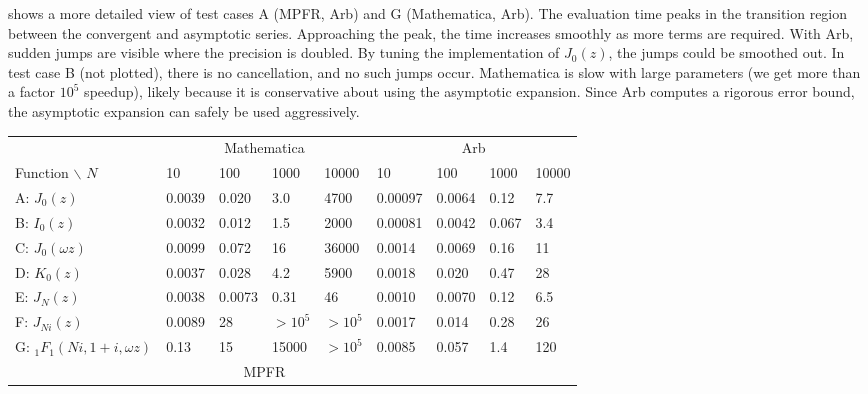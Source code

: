 \documentclass[11pt]{article}
\begin{document}
 shows a more detailed view of test cases A (MPFR, Arb) and G (Mathematica, Arb).
The evaluation time peaks in the transition region between the convergent and asymptotic series.
Approaching the peak, the time increases smoothly as more terms are required.
With Arb, sudden jumps are visible where the precision is doubled.
By tuning the implementation of $J_0(z)$, the jumps could be smoothed out.
In test case B (not plotted), there is no cancellation, and no such jumps occur.
Mathematica is slow with large parameters (we get more than a factor $10^5$ speedup),
likely because it is conservative about using the asymptotic expansion.
Since Arb computes a rigorous error bound, the asymptotic expansion
can safely be used aggressively.

\begin{table}
\renewcommand{\arraystretch}{1.4}
\setlength{\tabcolsep}{.4em}
\begin{center}
\begin{scriptsize}
\begin{tabular}{l | l l l l | l l l l}
                                  & \multicolumn{4}{|c|}{Mathematica} & \multicolumn{4}{|c}{Arb} \\
Function $\backslash$ $N$         &  10       & 100       & 1000 & 10000 &  10 & 100 & 1000 & 10000  \\ \hline
A: $J_0(z)$              &  0.0039   &  0.020    & 3.0     & 4700      &  0.00097   &  0.0064  &  0.12   &  7.7  \\
B: $I_0(z)$             &   0.0032   &  0.012    & 1.5     & 2000  &  0.00081   &  0.0042  &  0.067  &  3.4  \\
C: $J_0(\omega z)$      &   0.0099   &  0.072    & 16     & 36000      &  0.0014    &  0.0069  &  0.16   &  11   \\
D: $K_0(z)$             &   0.0037   &  0.028    & 4.2     &  5900  &  0.0018    &  0.020   &  0.47   &  28   \\
E: $J_N(z)$            &   0.0038   &  0.0073   & 0.31  &  46  &  0.0010    &  0.0070  &  0.12   &  6.5  \\
F: $J_{Ni}(z)$         &   0.0089   &  28       & $>10^5$     &   $>10^5$  &  0.0017    &  0.014   &  0.28   &  26   \\
G: ${}_1F_1(Ni,1+i,\omega z)$     &   0.13     &  15       & 15000     &  $>10^5$   &  0.0085    &  0.057   &  1.4    &  120    \\ \hline
           &   \multicolumn{4}{|c|}{MPFR} & \multicolumn{4}{|c}{ } \\ \hline

\end{tabular}
\end{scriptsize}
\end{center}
\end{table}
\end{document}
